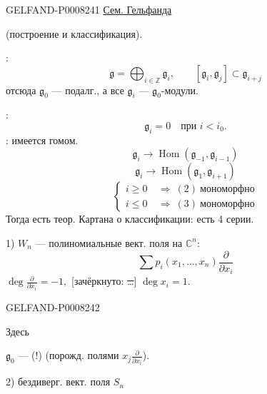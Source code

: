 \begin{GelfandAdjacentEvidence}{GELFAND-P000824}{1}
 \qquad \uline{Сем. Гельфанда}



(построение и классификация).

:
\[
\mathfrak g=\bigoplus_{i\in\mathbb{Z}}\mathfrak g_i,\qquad
[\mathfrak g_i,\mathfrak g_j]\subset\mathfrak g_{i+j}
\]
отсюда \(\mathfrak g_0\) — подалг., а все \(\mathfrak g_i\) —
\(\mathfrak g_0\)-модули.

:
\begin{equation*}
\mathfrak g_i=0\quad\text{при }i<i_0.\tag{1}
\end{equation*}
: имеется гомом.
\begin{equation*}
\mathfrak g_i\to\operatorname{Hom}(\mathfrak g_{-1},\mathfrak g_{i-1})\tag{2}
\end{equation*}
\begin{equation*}
\mathfrak g_i\to\operatorname{Hom}(\mathfrak g_1,\mathfrak g_{i+1})\tag{3}
\end{equation*}
\begin{equation*}
\left\{\begin{aligned}
i\ge0&\ \Rightarrow\ (2)\ \text{мономорфно}\\
i\le0&\ \Rightarrow\ (3)\ \text{мономорфно}
\end{aligned}\right.\tag{4}
\end{equation*}
Тогда есть теор. Картана о классификации: есть 4 серии.

1) \(W_n\) — полиномиальные вект. поля на \(\mathbb{C}^n\):
\begin{equation*}
\sum p_i(x_1,\ldots,x_n)\frac{\partial}{\partial x_i}\tag{5}
\end{equation*}
\(\deg\frac{\partial}{\partial x_i}=-1,\)
[зачёркнуто: \sout{…}]
\(\deg x_i=1.\)
\end{GelfandAdjacentEvidence}
\begin{GelfandAdjacentEvidence}{GELFAND-P000824}{2}


Здесь

\(\mathfrak g_0\) — (!)
(порожд. полями \(x_j\frac{\partial}{\partial x_i}\)).

2) бездиверг. вект. поля \(S_n\)
\end{GelfandAdjacentEvidence}


